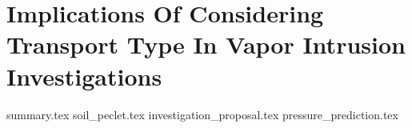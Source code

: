 \documentclass[../thesis.tex]{subfiles}
\begin{document}
\chapter{Implications Of Considering Transport Type In Vapor Intrusion Investigations}

{summary.tex}
{soil_peclet.tex}
{investigation_proposal.tex}
{pressure_prediction.tex}



\begin{comment}

Previous chapter review:
- Pe number analysis shows why different relationship between p_in and c_in
- May be indicative of a broader problem in VI investigations. Implications:
  - CPM
  - Use of ITS
  - Etc

- Shows importance to consider nature of transport at site for effective applications of this
  - Introduce flowsheet for investigation paradigm

- Seasonal aspect of this
  - Why higher c_in during winter
  - Explain with p_in for ASU and Indie (seasonal distribution of these)

- Predicting building pressurization (When are they the largest)
  - Show that we would predict that c_in and p_in is higher during

- Predicting air exchange rate (when is it the smallest?)

- How common
- Will explore some cases of this. Occur through modeling
  - Consider:
    - Soil type
    - Pressure
    - Depth

- Many soil cannot support flowrates fast enough
  - Advective transport likely to occur through
    - Most permeable soil types
    - Various site characteristics can facilitate this
      - Preferential pathways obvious one
        - Give examples on how to find these
      - Examples of other site possible cases (speculative)

- Determining advective/diffusive transport becomes the new issue


\end{comment}
\end{document}
